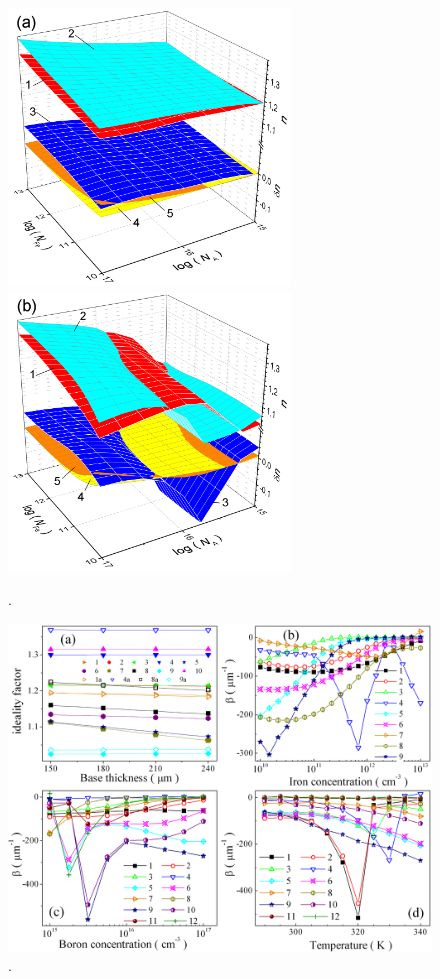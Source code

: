 \documentclass[12pt]{article}
\begin{document}
\begin{figure}
\includegraphics[width=7.5cm]{FigT290d18} \hfill
\includegraphics[width=7.5cm]{FigT340d18}
\caption{.
}
\label{FigNaNfe}
\end{figure}

\begin{figure}
\includegraphics[width=15cm]{FigTotal}
\caption{.
}
\label{FigTotal}
\end{figure}
\end{document}
